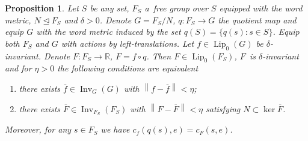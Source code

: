 \documentclass[11pt,a4paper]{amsart}
\newtheorem{proposition}[theorem]{Proposition}
\theoremstyle{definition}
\newcommand{\R}{\mathbb{R}}
\newcommand{\fBar}{\overline{f}}
\newcommand{\FBar}{\overline{F}}
\newcommand{\norm}[1]{\left\| #1 \right\|}
\newcommand{\Lipz}{\operatorname{Lip}_0}
\newcommand{\inv}{\operatorname{Inv}}
\begin{document}
	\begin{proposition} \label{prop:KYD_onFactor}
		Let $S$ be any set, $F_S$ a~free group over $S$ equipped with the word metric, $N \trianglelefteq F_S$ and $\delta > 0$. Denote $G = F_S / N$, $q: F_S \to G$ the quotient map and equip $G$ with the word metric induced by the set $q(S) = \{q(s) \colon s \in S\}$. Equip both $F_S$ and $G$ with actions by left-translations. Let $f \in \Lipz(G)$ be $\delta$-invariant. Denote $F: F_S \to \R$, $F = f \circ q$. Then $F \in \Lipz(F_S)$, $F$~is $\delta$-invariant and for $\eta > 0$ the following conditions are equivalent
		\begin{enumerate}
			\item there exists $\fBar \in \inv_G(G)$ with $\norm{f - \fBar} < \eta$;
			\item there exists $\FBar \in \inv_{F_S}(F_S)$ with $\norm{F - \FBar} < \eta$ satisfying $N \subset \ker \FBar$.
		\end{enumerate}
		Moreover, for any $s \in F_S$ we have $c_f(q(s), e) = c_F(s, e)$.
	\end{proposition}
\end{document}
